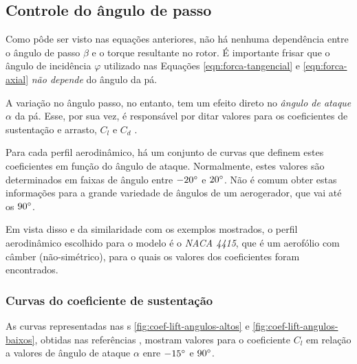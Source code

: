 \documentclass{article}
\begin{document}
	\subsection{Controle do ângulo de passo}
	Como pôde ser visto nas equações anteriores, não há nenhuma dependência entre o ângulo de passo $\beta$
	e o torque resultante no rotor.
	É importante frisar que o ângulo de incidência $\varphi$ utilizado nas Equações \ref{eqn:forca-tangencial} e \ref{eqn:forca-axial}
	\emph{não depende} do ângulo da pá.

	A variação no ângulo passo, no entanto, tem um efeito direto no \emph{ângulo de ataque} $\alpha$ da pá.
	Esse, por sua vez, é responsável por ditar valores para os coeficientes de sustentação e arrasto,
	$C_l$ e $C_d$ \cite{spera:2008,petrilli:2009,hoffmann:1996}.

	Para cada perfil aerodinâmico, há um conjunto de curvas que definem estes coeficientes em função do ângulo de ataque.
	Normalmente, estes valores são determinados em faixas de ângulo entre $-20\degree$ e $20\degree$.
	Não é comum obter estas informações para a grande variedade de ângulos de um aerogerador, que vai até os $90\degree$.

	Em vista disso e da similaridade com os exemplos mostrados, o perfil aerodinâmico escolhido para o modelo é o \emph{NACA 4415},
	que é um aerofólio com câmber (não-simétrico), para o quais os valores dos coeficientes foram encontrados.

	\subsubsection{Curvas do coeficiente de sustentação}
	As curvas representadas nas \figurename s \ref{fig:coef-lift-angulos-altos} e \ref{fig:coef-lift-angulos-baixos},
	obtidas nas referências \cite{airfoiltools:naca4415,petrilli:2009}, mostram valores
	para o coeficiente $C_l$ em relação a valores de ângulo de ataque $\alpha$ enre $-15\degree$ e $90\degree$.
\end{document}
